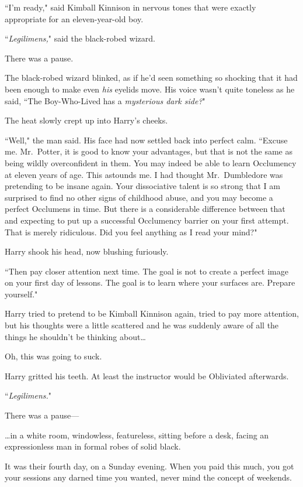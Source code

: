 ``I'm ready," said Kimball Kinnison in nervous tones that were exactly appropriate for an eleven-year-old boy.

``\emph{Legilimens,}" said the black-robed wizard.

There was a pause.

The black-robed wizard blinked, as if he'd seen something so shocking that it had been enough to make even \emph{his} eyelids move. His voice wasn't quite toneless as he said, ``The Boy-Who-Lived has a \emph{mysterious dark side?}"

The heat slowly crept up into Harry's cheeks.

``Well," the man said. His face had now settled back into perfect calm. ``Excuse me. Mr.~Potter, it is good to know your advantages, but that is not the same as being wildly overconfident in them. You may indeed be able to learn Occlumency at eleven years of age. This astounds me. I had thought Mr.~Dumbledore was pretending to be insane again. Your dissociative talent is so strong that I am surprised to find no other signs of childhood abuse, and you may become a perfect Occlumens in time. But there is a considerable difference between that and expecting to put up a successful Occlumency barrier on your first attempt. That is merely ridiculous. Did you feel anything as I read your mind?"

Harry shook his head, now blushing furiously.

``Then pay closer attention next time. The goal is not to create a perfect image on your first day of lessons. The goal is to learn where your surfaces are. Prepare yourself."

Harry tried to pretend to be Kimball Kinnison again, tried to pay more attention, but his thoughts were a little scattered and he was suddenly aware of all the things he shouldn't be thinking about{\ldots}

Oh, this was going to suck.

Harry gritted his teeth. At least the instructor would be Obliviated afterwards.

``\emph{Legilimens.}"

There was a pause---

\later

{\ldots}in a white room, windowless, featureless, sitting before a desk, facing an expressionless man in formal robes of solid black.

It was their fourth day, on a Sunday evening. When you paid this much, you got your sessions any darned time you wanted, never mind the concept of weekends.

